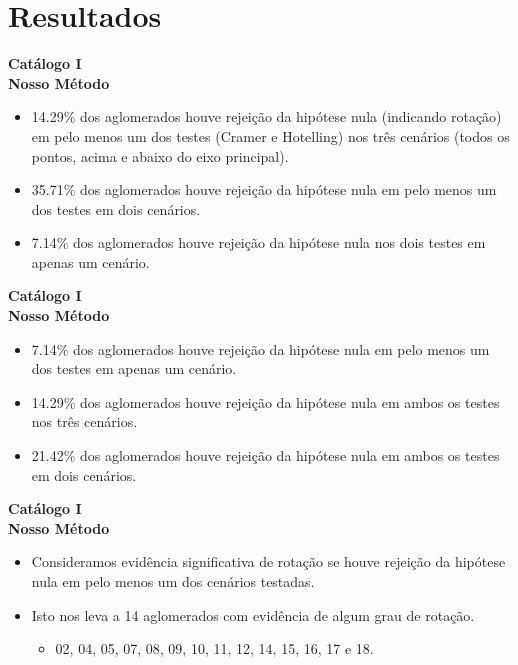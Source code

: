 \documentclass[xcolor=dvipsnames,10pt]{beamer}
\begin{document}
\section{Resultados}
\begin{frame}{\textbf{Catálogo I}}
  \\
  {\textbf{Nosso Método}}
  \begin{itemize}
    \item 14.29\% dos aglomerados houve rejeição da hipótese nula (indicando rotação) em pelo menos um dos testes (Cramer e Hotelling) nos três cenários (todos os pontos, acima e abaixo do eixo principal).
    \item 35.71\% dos aglomerados houve rejeição da hipótese nula em pelo menos um dos testes em dois cenários.
    \item 7.14\% dos aglomerados houve rejeição da hipótese nula nos dois testes em apenas um cenário.
  \end{itemize}
\end{frame}

\begin{frame}{\textbf{Catálogo I}}
  \\
  {\textbf{Nosso Método}}
  \begin{itemize}
    \item 7.14\% dos aglomerados houve rejeição da hipótese nula em pelo menos um dos testes em apenas um cenário.
    \item 14.29\% dos aglomerados houve rejeição da hipótese nula em ambos os testes nos três cenários.
    \item 21.42\% dos aglomerados houve rejeição da hipótese nula em ambos os testes em dois cenários.
  \end{itemize}
\end{frame}

\begin{frame}{\textbf{Catálogo I}}
  \\
  {\textbf{Nosso Método}}
  \begin{itemize}
    \item Consideramos evidência significativa de rotação se houve rejeição da hipótese nula em pelo menos um dos cenários testadas.
    \item Isto nos leva a 14 aglomerados com evidência de algum grau de rotação.
    \begin{itemize}
      \item 02, 04, 05, 07, 08, 09, 10, 11, 12, 14, 15, 16, 17 e 18.
    \end{itemize}
  \end{itemize}
\end{frame}
\end{document}
